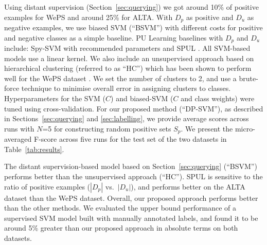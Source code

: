 \documentclass[letterpaper]{sig-alternate-2013}
\newcommand{\tabref}[1]{Table~\ref{#1}\xspace}
\newcommand{\secref}[2][]{Section#1~\ref{#2}\xspace}
\begin{document}
Using distant supervision (\secref{sec:querying}) we got around 10\% of positive examples for WePS and around 25\% for ALTA. With $D_{p}$ as positive and $D_{u}$ as negative examples, we use biased SVM (``BSVM'') with different costs for positive and negative classes as a simple baseline. PU Learning baselines with $D_{p}$ and $D_{u}$ include: Spy-SVM with recommended parameters \cite{liu2002partially} and SPUL \cite{Elkan:2008:LCO:1401890.1401920}. All SVM-based models use a linear kernel. We also include an unsupervised approach based on  hierarchical clustering (referred to as ``HC'') which has been shown to perform well for the WePS dataset \cite{delgado2014data}. We set the number of clusters to 2, and use a brute-force technique to minimise overall error in assigning clusters to classes.
Hyperparameters for the SVM ($C$) and biased-SVM ($C$ and class weights) were tuned using cross-validation. For our proposed method (``DP-SVM''), as described in \secref[s]{sec:querying} and \ref{sec:labelling}, we provide average scores across runs with $N$=5 for constructing random positive sets $S_{p}$. We present the micro-averaged F-score across five runs for the test set of the two datasets in \tabref{tab:results}. 

The distant supervision-based model based on \secref{sec:querying} (``BSVM'') performs better than the unsupervised approach (``HC''). SPUL is sensitive to the ratio of positive examples ($|D_{p}|$ vs.\ $|D_{u}|$), and performs better on the ALTA dataset than the WePS dataset. Overall, our proposed approach performs better than the other methods. We evaluated the upper bound performance of a supervised SVM model built with manually annotated labels, and found it to be around 5\% greater than our proposed approach in absolute terms on both datasets.
\end{document}
